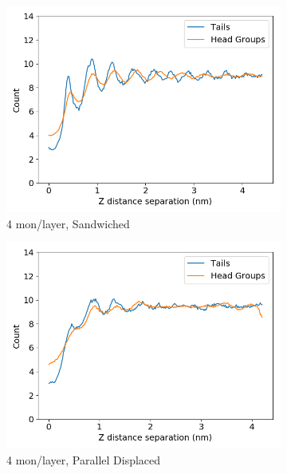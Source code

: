 \documentclass{article}
\begin{document}
  \begin{figure}
	\centering
        \begin{subfigure}{0.40\textwidth}
                \centering
                \includegraphics[width=\textwidth]{zdf_layered_4.png}
                \caption{4 mon/layer, Sandwiched}\label{fig:zdf_layered_4}
        \end{subfigure}
        \begin{subfigure}{0.40\textwidth}
                \centering
                \includegraphics[width=\textwidth]{zdf_offset_4.png}
                \caption{4 mon/layer, Parallel Displaced}\label{fig:zdf_layered_4}
        \end{subfigure}
	\begin{subfigure}{0.40\textwidth}

\end{subfigure}
\end{figure}
\end{document}
